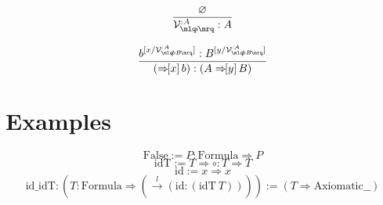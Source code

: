 \documentclass{article}
\newcommand{\usage}{\mathcal{V}}
\newcommand{\usageKnown}[2]{{\usage_{\mlq\hspace{-0.06em}#2\hspace{-0.06em}\mrq}^{:#1}}}
\newcommand{\subst}[3]{#1^{[{#2}{/}{#3}]}}
\newcommand{\hole}{\circ}
\newcommand{\hastype}[2]{#1 : #2}
\newcommand{\namemappinguntyped}[2]{#1 \Rightarrow #2}
\newcommand{\namemappingtype}[3]{#1:#2 \Rightarrow #3}
\newcommand{\treemappinguntyped}[2]{\Rightarrow\hspace{-0.4em}[#1]\,#2}
\newcommand{\treemappingtype}[3]{#1 \treemappinguntyped{#2}{#3}}
\newcommand{\unfoldsin}[1]{\overset{#1}{\rightarrow}}
\begin{document}
  \[ \frac{
\varnothing
  }{
    \hastype{\usageKnown{A}{i}}{A}
  } \]

  \[ \frac{
    \hastype{\subst{b}{x}{\usageKnown{A}{bB}}}{\subst{B}{y}{\usageKnown{A}{bB}}}
  }{
    \hastype{
      (\treemappinguntyped{x} b)
    }{
      (\treemappingtype{A}{y}{B})
    }
  } \]
  \section{Examples}\label{structure}
  \[
    \mathrm{False} := \namemappingtype{P}{\mathrm{Formula}}{P}
  \]
  \[
    \mathrm{idT} := \namemappinguntyped{T}{\namemappingtype{\hole}{T}{T}}
  \]
  \[
    \mathrm{id} := \namemappinguntyped{x}{x}
  \]
  \[
    \mathrm{id\_idT} : (\namemappingtype{T}{\mathrm{Formula}}{(\unfoldsin{l}{(\hastype{\mathrm{id}}{(\mathrm{idT}\ T)})})}) := (\namemappinguntyped{T}{\mathrm{Axiomatic \_ \_}})
  \]

\end{document}

